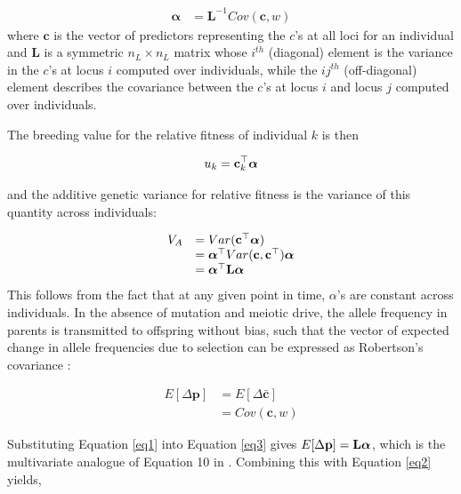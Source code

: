 \documentclass[12pt]{article}
\begin{document}
\begin{bibunit}
\begin{equation} \label{eq1}
\begin{array}{rl} 
\boldsymbol{{\alpha}} &= \textbf{L}^{-1}Cov(\textbf{c}, w) 
\end{array}
\end{equation}
where $\textbf{c}$ is the vector of predictors representing the $c$'s at all loci for an individual and $\textbf{L}$ is a symmetric ${n_L} \times {n_L}$ matrix whose $i^{th}$ (diagonal) element is the variance in the $c$'s at locus $i$ computed over individuals, while the  $ij^{th}$ (off-diagonal) element describes the covariance between the $c$'s at locus $i$ and locus $j$ computed over individuals. 

The breeding value for the relative fitness of individual $k$ is then

$$u_k = {\bf c}^{\top}_{k}\boldsymbol{{\alpha}}$$


and the additive genetic variance for relative fitness is the variance of this quantity across individuals:

\begin{equation} \label{eq2}
\begin{array}{rl} 
{V_A} &= Var({\bf c}^{\top}\boldsymbol{{\alpha}}) \\ 
&= \boldsymbol{{\alpha}}^{\top}Var({\bf c}, {\bf c}^{\top})\boldsymbol{{\alpha}}\\ 
&= \boldsymbol{\alpha}^{\top}\textbf{L}\boldsymbol{\alpha}\\
\end{array}
\end{equation}
This follows from the fact that at any given point in time, $\alpha$'s are constant across individuals. In the absence of mutation and meiotic drive, the allele frequency in parents is transmitted to offspring without bias, such that the vector of expected change in allele frequencies due to selection can be expressed as Robertson's covariance \citep{robertson1966mathematical, price1970selection, queller2017fundamental}:

\begin{equation} \label{eq3}
\begin{array}{rl}
E[\Delta{\textbf{p}}] &= E[\Delta\bar{{\textbf{c}}}]\\
&= Cov(\textbf{c}, w)
\end{array}
\end{equation}

Substituting Equation \ref{eq1} into Equation \ref{eq3} gives $E[\Delta{\textbf{p}}] = {\bf L}\boldsymbol{\alpha}$, which is the multivariate analogue of Equation 10 in \citet{Kirkpatrick.2002}. Combining this with Equation \ref{eq2} yields,
 

\end{bibunit}
\end{document}
